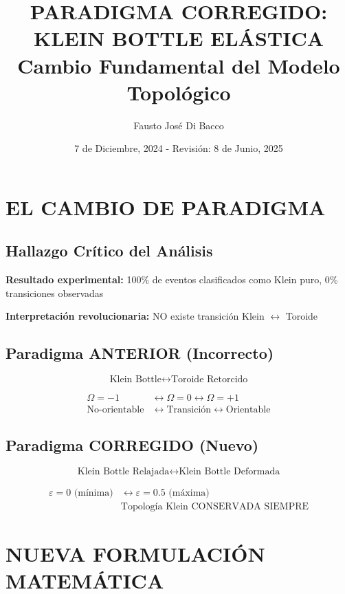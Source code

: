 \documentclass[12pt,a4paper]{article}
\title{\Large \textbf{PARADIGMA CORREGIDO: KLEIN BOTTLE ELÁSTICA}\\
\large Cambio Fundamental del Modelo Topológico}
\author{Fausto José Di Bacco}
\date{7 de Diciembre, 2024 - Revisión: 8 de Junio, 2025}
\begin{document}
\maketitle

\section{EL CAMBIO DE PARADIGMA}

\subsection{Hallazgo Crítico del Análisis}

\textbf{Resultado experimental:} 100\% de eventos clasificados como Klein puro, 0\% transiciones observadas

\textbf{Interpretación revolucionaria:} NO existe transición Klein $\leftrightarrow$ Toroide

\subsection{Paradigma ANTERIOR (Incorrecto)}

\begin{equation}
\text{Klein Bottle} \leftrightarrow \text{Toroide Retorcido}
\end{equation}

\begin{align}
\Omega = -1 &\leftrightarrow \Omega = 0 \leftrightarrow \Omega = +1\\
\text{No-orientable} &\leftrightarrow \text{Transición} \leftrightarrow \text{Orientable}
\end{align}

\subsection{Paradigma CORREGIDO (Nuevo)}

\begin{equation}
\text{Klein Bottle Relajada} \leftrightarrow \text{Klein Bottle Deformada}
\end{equation}

\begin{align}
\varepsilon = 0 \text{ (mínima)} &\leftrightarrow \varepsilon = 0.5 \text{ (máxima)}\\
&\text{Topología Klein CONSERVADA SIEMPRE}
\end{align}

\section{NUEVA FORMULACIÓN MATEMÁTICA}
\end{document}
